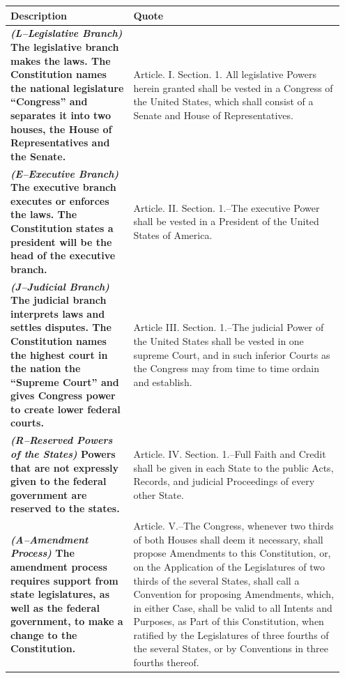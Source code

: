 \begin{center}
	\begin{table}[htbp]
		\begin{tabular}{ p{0.35\linewidth} | p{0.6\linewidth} } 
			\hline
			Description & Quote \\
			\hline
			\bf{\it{(L–Legislative Branch)}} The legislative branch makes the laws. The Constitution names the national legislature
			\bf{“Congress”} and separates it into two houses, the House of Representatives and the Senate. & Article. I. Section. 1.
			All legislative Powers herein granted shall be vested in a Congress of the United States, which shall consist of a Senate and
			House of Representatives. \\ \hline
		    \bf{\it{(E–Executive Branch)}} The executive branch executes or enforces the laws. The Constitution states a president
			will be the head of the executive branch. & Article. II. Section. 1.–The executive Power shall be vested in a President of the
			United States of America. \\ \hline
			\bf{\it{(J–Judicial Branch)}} The judicial branch interprets laws and settles disputes. The Constitution names the
			highest court in the nation the “Supreme Court” and gives Congress power to create lower federal courts. & Article III.
			Section. 1.–The judicial Power of the United States shall be vested in one supreme Court, and in such inferior Courts as the
			Congress may from time to time ordain and establish. \\ \hline
			\bf{\it{(R–Reserved Powers of the States)}} Powers that are not expressly given to the federal government are reserved
			to the states. & Article. IV. Section. 1.–Full Faith and Credit shall be given in each State to the public Acts, Records, and
			judicial Proceedings of every other State. \\ \hline
			\bf{\it{(A–Amendment Process)}} The amendment process requires support from state legislatures, as well as the federal
			government, to make a change to the Constitution. & Article. V.–The Congress, whenever two thirds of both Houses shall deem it
			necessary, shall propose Amendments to this Constitution, or, on the Application of the Legislatures of two thirds of the
			several States, shall call a Convention for proposing Amendments, which, in either Case, shall be valid to all Intents and
			Purposes, as Part of this Constitution, when ratified by the Legislatures of three fourths of the several States, or by
			Conventions in three fourths thereof. \\ \hline

\end{tabular}
\end{table}
\end{center}
